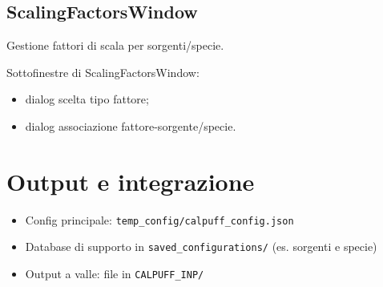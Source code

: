 \subsection{ScalingFactorsWindow}
Gestione fattori di scala per sorgenti/specie.

Sottofinestre di ScalingFactorsWindow:
\begin{itemize}[leftmargin=1.5em]
  \item dialog scelta tipo fattore;
  \item dialog associazione fattore-sorgente/specie.
\end{itemize}

\section{Output e integrazione}
\begin{itemize}[leftmargin=1.5em]
  \item Config principale: \texttt{temp\_config/calpuff\_config.json}
  \item Database di supporto in \texttt{saved\_configurations/} (es. sorgenti e specie)
  \item Output a valle: file in \texttt{CALPUFF\_INP/}
\end{itemize}
